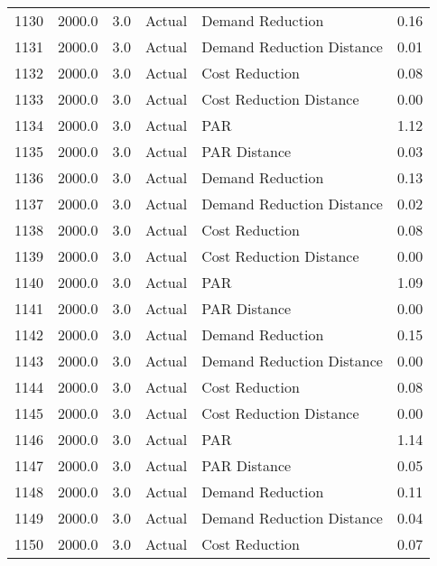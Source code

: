 \begin{longtable}{lrrllr}
1130 &       2000.0 &     3.0 &         Actual &           Demand Reduction &   0.16 \\
1131 &       2000.0 &     3.0 &         Actual &  Demand Reduction Distance &   0.01 \\
1132 &       2000.0 &     3.0 &         Actual &             Cost Reduction &   0.08 \\
1133 &       2000.0 &     3.0 &         Actual &    Cost Reduction Distance &   0.00 \\
1134 &       2000.0 &     3.0 &         Actual &                        PAR &   1.12 \\
1135 &       2000.0 &     3.0 &         Actual &               PAR Distance &   0.03 \\
1136 &       2000.0 &     3.0 &         Actual &           Demand Reduction &   0.13 \\
1137 &       2000.0 &     3.0 &         Actual &  Demand Reduction Distance &   0.02 \\
1138 &       2000.0 &     3.0 &         Actual &             Cost Reduction &   0.08 \\
1139 &       2000.0 &     3.0 &         Actual &    Cost Reduction Distance &   0.00 \\
1140 &       2000.0 &     3.0 &         Actual &                        PAR &   1.09 \\
1141 &       2000.0 &     3.0 &         Actual &               PAR Distance &   0.00 \\
1142 &       2000.0 &     3.0 &         Actual &           Demand Reduction &   0.15 \\
1143 &       2000.0 &     3.0 &         Actual &  Demand Reduction Distance &   0.00 \\
1144 &       2000.0 &     3.0 &         Actual &             Cost Reduction &   0.08 \\
1145 &       2000.0 &     3.0 &         Actual &    Cost Reduction Distance &   0.00 \\
1146 &       2000.0 &     3.0 &         Actual &                        PAR &   1.14 \\
1147 &       2000.0 &     3.0 &         Actual &               PAR Distance &   0.05 \\
1148 &       2000.0 &     3.0 &         Actual &           Demand Reduction &   0.11 \\
1149 &       2000.0 &     3.0 &         Actual &  Demand Reduction Distance &   0.04 \\
1150 &       2000.0 &     3.0 &         Actual &             Cost Reduction &   0.07 \\

\end{longtable}
